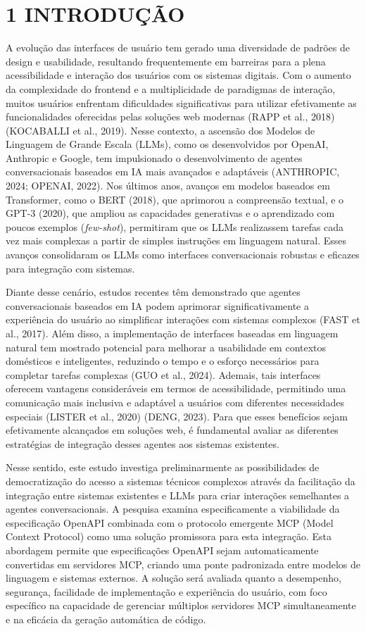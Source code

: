 \documentclass[
]{article}
\begin{document}
\section{1 INTRODUÇÃO}\label{introduuxe7uxe3o}

A evolução das interfaces de usuário tem gerado uma diversidade de
padrões de design e usabilidade, resultando frequentemente em barreiras
para a plena acessibilidade e interação dos usuários com os sistemas
digitais. Com o aumento da complexidade do frontend e a multiplicidade
de paradigmas de interação, muitos usuários enfrentam dificuldades
significativas para utilizar efetivamente as funcionalidades oferecidas
pelas soluções web modernas (RAPP et al., 2018) (KOCABALLI et al.,
2019). Nesse contexto, a ascensão dos Modelos de Linguagem de Grande
Escala (LLMs), como os desenvolvidos por OpenAI, Anthropic e Google, tem
impulsionado o desenvolvimento de agentes conversacionais baseados em IA
mais avançados e adaptáveis (ANTHROPIC, 2024; OPENAI, 2022). Nos últimos
anos, avanços em modelos baseados em Transformer, como o BERT (2018),
que aprimorou a compreensão textual, e o GPT-3 (2020), que ampliou as
capacidades generativas e o aprendizado com poucos exemplos
(\emph{few-shot}), permitiram que os LLMs realizassem tarefas cada vez
mais complexas a partir de simples instruções em linguagem natural.
Esses avanços consolidaram os LLMs como interfaces conversacionais
robustas e eficazes para integração com sistemas.

Diante desse cenário, estudos recentes têm demonstrado que agentes
conversacionais baseados em IA podem aprimorar significativamente a
experiência do usuário ao simplificar interações com sistemas complexos
(FAST et al., 2017). Além disso, a implementação de interfaces baseadas
em linguagem natural tem mostrado potencial para melhorar a usabilidade
em contextos domésticos e inteligentes, reduzindo o tempo e o esforço
necessários para completar tarefas complexas (GUO et al., 2024).
Ademais, tais interfaces oferecem vantagens consideráveis em termos de
acessibilidade, permitindo uma comunicação mais inclusiva e adaptável a
usuários com diferentes necessidades especiais (LISTER et al., 2020)
(DENG, 2023). Para que esses benefícios sejam efetivamente alcançados em
soluções web, é fundamental avaliar as diferentes estratégias de
integração desses agentes aos sistemas existentes.

Nesse sentido, este estudo investiga preliminarmente as possibilidades
de democratização do acesso a sistemas técnicos complexos através da
facilitação da integração entre sistemas existentes e LLMs para criar
interações semelhantes a agentes conversacionais. A pesquisa examina
especificamente a viabilidade da especificação OpenAPI combinada com o
protocolo emergente MCP (Model Context Protocol) como uma solução
promissora para esta integração. Esta abordagem permite que
especificações OpenAPI sejam automaticamente convertidas em servidores
MCP, criando uma ponte padronizada entre modelos de linguagem e sistemas
externos. A solução será avaliada quanto a desempenho, segurança,
facilidade de implementação e experiência do usuário, com foco
específico na capacidade de gerenciar múltiplos servidores MCP
simultaneamente e na eficácia da geração automática de código.
\end{document}
